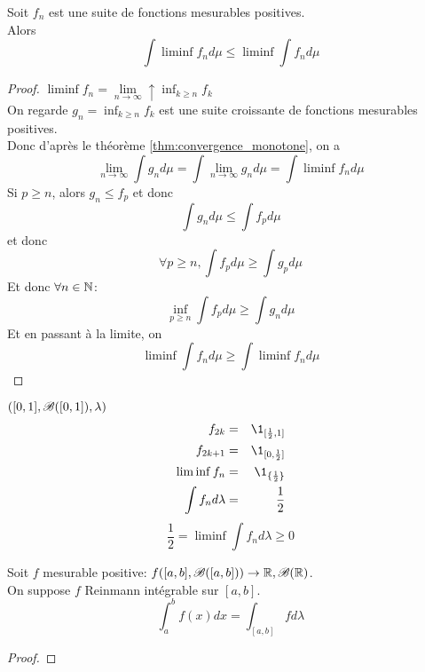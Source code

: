 \begin{theorem}
	Soit $f_n$ est une suite de fonctions mesurables positives.\\
	Alors
	$$ \int \liminf f_n d\mu \leq \liminf \int f_n d\mu $$
\end{theorem}

\begin{proof}
	$\liminf f_n = \lim\limits_{n \to \infty} \uparrow \inf_{k \geq n} f_k$\\
	On regarde $g_n = \inf_{k \geq n} f_k$ est une suite croissante de fonctions mesurables positives.\\
	Donc d'après le théorème \ref{thm:convergence_monotone}, on a
	$$ \lim\limits_{n \to \infty} \int g_n d\mu = \int \lim\limits_{n \to \infty} g_n d\mu = \int \liminf f_n d\mu $$
	Si $p \geq n$, alors $g_n \leq f_p$ et donc
	$$ \int g_n d\mu \leq \int f_p d\mu $$
	et donc
	$$ \forall p \geq n, \int f_p d\mu \geq \int g_p d\mu $$
	Et donc $\forall n \in \mathbb{N}$:
	$$ \inf_{p \geq n} \int f_p d\mu \geq \int g_n d\mu $$
	Et en passant à la limite, on
	$$ \liminf \int f_n d\mu \geq \int \liminf f_n d\mu $$
\end{proof}


\begin{example} $([0,1], \mathscr{B}([0,1]),\lambda)$\\
	\begin{eqnarray*}
		f_{2k} &=& \1_{[\frac{1}{2}, 1]}\\
		f_{2k+1} &=& \1_{[0,\frac{1}{2}]}\\
		\liminf f_n &=& \1_{\{\frac{1}{2}\}}\\
		\int f_n d \lambda &=& \frac{1}{2}
	\end{eqnarray*}
	$$ \frac{1}{2} = \liminf \int f_n d \lambda \geq 0 $$
\end{example}


\begin{theorem}
	Soit $f$ mesurable positive:
	$ f ([a,b], \mathscr{B}([a,b])) \to \mathbb{R}, \mathscr{B}(\mathbb{R})$.\\
	On suppose $f$ Reinmann intégrable sur $[a,b]$.\\
	$$ \int_a^b f(x) dx = \int_{[a,b]} f d\lambda $$
\end{theorem}

\begin{proof} %

\end{proof}
